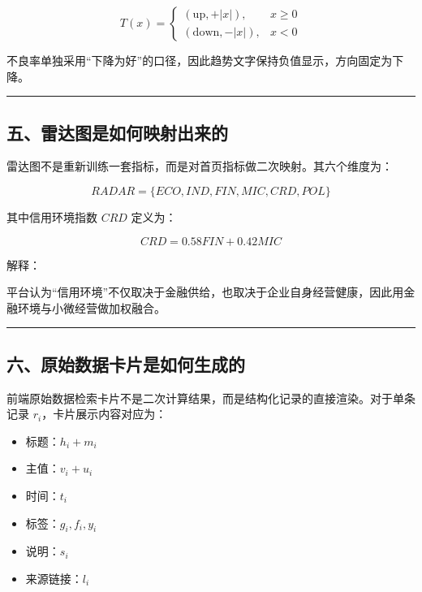\documentclass[
]{article}
\providecommand{\tightlist}{%
  \setlength{\itemsep}{0pt}\setlength{\parskip}{0pt}}
\begin{document}
\[
T(x) =
\begin{cases}
(\text{up}, +|x|), & x \ge 0\\
(\text{down}, -|x|), & x < 0
\end{cases}
\]

不良率单独采用``下降为好''的口径，因此趋势文字保持负值显示，方向固定为下降。

\begin{center}\rule{0.5\linewidth}{0.5pt}\end{center}

\subsection{五、雷达图是如何映射出来的}\label{ux4e94ux96f7ux8fbeux56feux662fux5982ux4f55ux6620ux5c04ux51faux6765ux7684}

雷达图不是重新训练一套指标，而是对首页指标做二次映射。其六个维度为：

\[
RADAR = \{ECO, IND, FIN, MIC, CRD, POL\}
\]

其中信用环境指数 \(CRD\) 定义为：

\[
CRD = 0.58FIN + 0.42MIC
\]

解释：

平台认为``信用环境''不仅取决于金融供给，也取决于企业自身经营健康，因此用金融环境与小微经营做加权融合。

\begin{center}\rule{0.5\linewidth}{0.5pt}\end{center}

\subsection{六、原始数据卡片是如何生成的}\label{ux516dux539fux59cbux6570ux636eux5361ux7247ux662fux5982ux4f55ux751fux6210ux7684}

前端原始数据检索卡片不是二次计算结果，而是结构化记录的直接渲染。对于单条记录
\(r_i\)，卡片展示内容对应为：

\begin{itemize}
\tightlist
\item
  标题：\(h_i + m_i\)
\item
  主值：\(v_i + u_i\)
\item
  时间：\(t_i\)
\item
  标签：\(g_i, f_i, y_i\)
\item
  说明：\(s_i\)
\item
  来源链接：\(l_i\)
\end{itemize}
\end{document}
